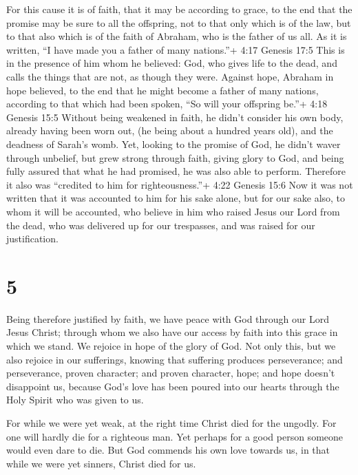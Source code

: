  For this cause it is of faith, that it may be according to
grace, to the end that the promise may be sure to all the offspring, not
to that only which is of the law, but to that also which is of the faith
of Abraham, who is the father of us all.  As it is written,
``I have made you a father of many nations.''+ 4:17 Genesis 17:5 This is
in the presence of him whom he believed: God, who gives life to the
dead, and calls the things that are not, as though they were.
 Against hope, Abraham in hope believed, to the end that he
might become a father of many nations, according to that which had been
spoken, ``So will your offspring be.''+ 4:18 Genesis 15:5 
Without being weakened in faith, he didn't consider his own body,
already having been worn out, (he being about a hundred years old), and
the deadness of Sarah's womb.  Yet, looking to the promise
of God, he didn't waver through unbelief, but grew strong through faith,
giving glory to God,  and being fully assured that what he
had promised, he was also able to perform.  Therefore it
also was ``credited to him for righteousness.''+ 4:22 Genesis 15:6
 Now it was not written that it was accounted to him for
his sake alone,  but for our sake also, to whom it will be
accounted, who believe in him who raised Jesus our Lord from the dead,
 who was delivered up for our trespasses, and was raised
for our justification.

\hypertarget{section-4}{%
\section{5}\label{section-4}}

 Being therefore justified by faith, we have peace with God
through our Lord Jesus Christ;  through whom we also have
our access by faith into this grace in which we stand. We rejoice in
hope of the glory of God.  Not only this, but we also
rejoice in our sufferings, knowing that suffering produces perseverance;
 and perseverance, proven character; and proven character,
hope;  and hope doesn't disappoint us, because God's love
has been poured into our hearts through the Holy Spirit who was given to
us.

 For while we were yet weak, at the right time Christ died
for the ungodly.  For one will hardly die for a righteous
man. Yet perhaps for a good person someone would even dare to die.
 But God commends his own love towards us, in that while we
were yet sinners, Christ died for us.

